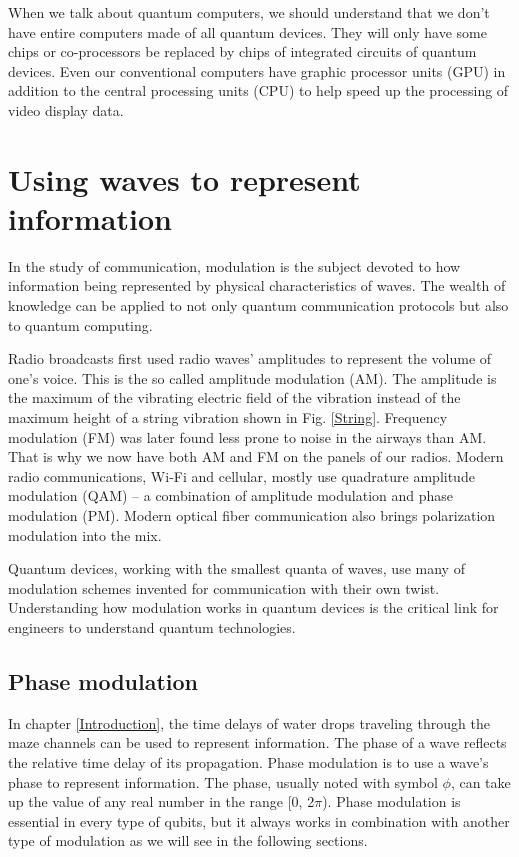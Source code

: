 \documentclass[Letter,11pt]{book}
\begin{document}
When we talk about quantum computers, we should understand that we don't have entire computers made of all quantum devices. They will only have some chips or co-processors be replaced by chips of integrated circuits of quantum devices. Even our conventional computers have graphic processor units (GPU) in addition to the central processing units (CPU) to help speed up the processing of video display data.

\chapter{Using waves to represent information}

In the study of communication, modulation is the subject devoted to how information being represented by physical characteristics of waves. The wealth of knowledge can be applied to not only quantum communication protocols but also to quantum computing.

Radio broadcasts first used radio waves' amplitudes to represent the volume of one's voice. This is the so called amplitude modulation (AM). The amplitude is the maximum of the vibrating electric field of the vibration instead of the maximum height of a string vibration shown in Fig. \ref{String}. Frequency modulation (FM) was later found less prone to noise in the airways than AM. That is why we now have both AM and FM on the panels of our radios. Modern radio communications, Wi-Fi and cellular, mostly use quadrature amplitude modulation (QAM) -- a combination of amplitude modulation and phase modulation (PM). Modern optical fiber communication also brings polarization modulation into the mix.

Quantum devices, working with the smallest quanta of waves, use many of modulation schemes invented for communication with their own twist. Understanding how modulation works in quantum devices is the critical link for engineers to understand quantum technologies.

\section{Phase modulation}
In chapter \ref{Introduction}, the time delays of water drops traveling through the maze channels can be used to represent information. The phase of a wave reflects the relative time delay of its propagation. Phase modulation is to use a wave's phase to represent information. The phase, usually noted with symbol $\phi$, can take up the value of any real number in the range [0, 2$\pi$). Phase modulation is essential in every type of qubits, but it always works in combination with another type of modulation as we will see in the following sections.
\end{document}
